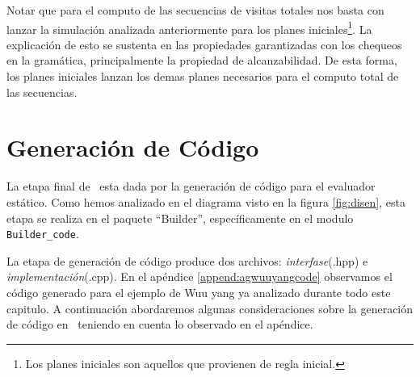 Notar que para el computo de las secuencias de visitas totales nos basta con lanzar la simulación analizada anteriormente para los planes iniciales\footnote{Los planes iniciales son aquellos que provienen de regla inicial.}. La explicación de esto se sustenta en las propiedades garantizadas con los chequeos en la gramática, principalmente la propiedad de alcanzabilidad. De esta forma, los planes iniciales lanzan los demas planes necesarios para el computo total de las secuencias.


\section{Generación de Código}
La etapa final de \maggen\ esta dada por la generación de código para el evaluador estático. Como hemos analizado en el diagrama visto en la figura \ref{fig:disen}, esta etapa se realiza en el paquete ``Builder'', específicamente en el modulo \texttt{Builder\_code}.

La etapa de generación de código produce dos archivos: \textit{interfase}(.hpp) e \textit{implementación}(.cpp). En el apéndice \ref{append:agwuuyangcode} observamos el código generado para el ejemplo de Wuu yang ya analizado durante todo este capitulo.
A continuación abordaremos algunas consideraciones sobre la generación de código en \maggen\ teniendo en cuenta lo observado en el apéndice.

